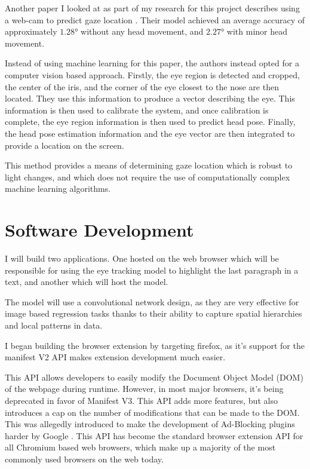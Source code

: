 \documentclass[twocolumn]{report}
\begin{document}
Another paper I looked at as part of my research for this project describes using a web-cam to predict gaze location \cite{yiuming2015eyegazetracking}. Their model achieved an average accuracy of approximately $\ang{1.28}$ without any head movement, and $\ang{2.27}$ with minor head movement. 

Instead of using machine learning for this paper, the authors instead opted for a computer vision based approach. Firstly, the eye region is detected and cropped, the center of the iris, and the corner of the eye closest to the nose are then located. They use this information to produce a vector describing the eye. This information is then used to calibrate the system, and once calibration is complete, the eye region information is then used to predict head pose. Finally, the head pose estimation information and the eye vector are then integrated to provide a location on the screen. 

This method provides a means of determining gaze location which is robust to light changes, and which does not require the use of computationally complex machine learning algorithms. 

\section{Software Development}\label{sec:software-dev}

I will build two applications. One hosted on the web browser which will be responsible for using the eye tracking model to highlight the last paragraph in a text, and another which will host the model. 

The model will use a convolutional network design, as they are very effective for image based regression tasks thanks to their ability to capture spatial hierarchies and local patterns in data. 

I began building the browser extension by targeting firefox, as it's support for the manifest V2 API makes extension development much easier. 

This API allows developers to easily modify the Document Object Model (DOM) of the webpage during runtime. However, in most major browsers, it's being deprecated in favor of Manifest V3. This API adds more features, but also introduces a cap on the number of modifications that can be made to the DOM. This was allegedly introduced to make the development of Ad-Blocking plugins harder by Google \cite{frisbe2022building}. This API has become the standard browser extension API for all Chromium based web browsers, which make up a majority of the most commonly used browsers on the web today. 
\end{document}
